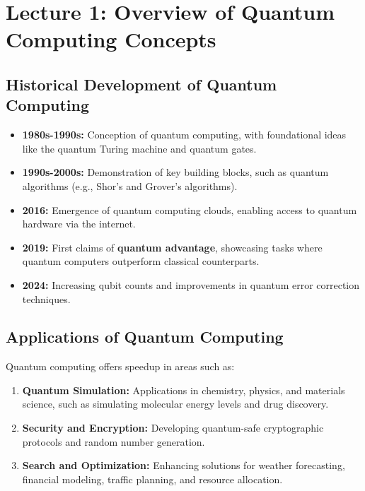 \section{Lecture 1: Overview of Quantum Computing Concepts}

\subsection*{Historical Development of Quantum Computing}
\begin{itemize}
    \item \textbf{1980s-1990s:} Conception of quantum computing, with foundational ideas like the quantum Turing machine and quantum gates.
    \item \textbf{1990s-2000s:} Demonstration of key building blocks, such as quantum algorithms (e.g., Shor's and Grover's algorithms).
    \item \textbf{2016:} Emergence of quantum computing clouds, enabling access to quantum hardware via the internet.
    \item \textbf{2019:} First claims of \textbf{quantum advantage}, showcasing tasks where quantum computers outperform classical counterparts.
    \item \textbf{2024:} Increasing qubit counts and improvements in quantum error correction techniques.
\end{itemize}

\subsection*{Applications of Quantum Computing}
Quantum computing offers speedup in areas such as:
\begin{enumerate}
    \item \textbf{Quantum Simulation:} Applications in chemistry, physics, and materials science, such as simulating molecular energy levels and drug discovery.
    \item \textbf{Security and Encryption:} Developing quantum-safe cryptographic protocols and random number generation.
    \item \textbf{Search and Optimization:} Enhancing solutions for weather forecasting, financial modeling, traffic planning, and resource allocation.
\end{enumerate}

